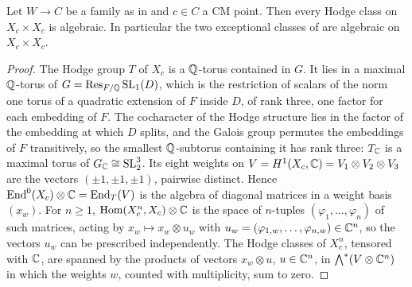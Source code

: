\begin{theorem}\label{thm:mumfordcm}
Let $W\to C$ be a family as in  and $c\in C$ a CM
point. Then every Hodge class on $X_{c}\times X_{c}$ is algebraic. In
particular the two exceptional classes of  are
algebraic on $X_{c}\times X_{c}$.
\end{theorem}

\begin{proof}
The Hodge group $T$ of $X_{c}$ is a $\mathbb{Q}$-torus contained in $G$. It lies in a
maximal $\mathbb{Q}$-torus of $G=\operatorname{Res}_{F/\mathbb{Q}}\operatorname{SL}_{1}(D)$, which is the restriction of
scalars of the norm one torus of a quadratic extension of $F$ inside $D$, of
rank three, one factor for each embedding of $F$. The cocharacter of the Hodge
structure lies in the factor of the embedding at which $D$ splits, and the
Galois group permutes the embeddings of $F$ transitively, so the smallest
$\mathbb{Q}$-subtorus containing it has rank three: $T_{\mathbb{C}}$ is a maximal torus of
$G_{\mathbb{C}}\cong\operatorname{SL}_{2}^{3}$. Its eight weights on
$V=H^{1}(X_{c},\mathbb{C})=V_{1}\otimes V_{2}\otimes V_{3}$ are the vectors
$(\pm1,\pm1,\pm1)$, pairwise distinct. Hence
$\operatorname{End}^{0}(X_{c})\otimes\mathbb{C}=\operatorname{End}_{T}(V)$ is the algebra of diagonal matrices
in a weight basis $(x_{w})$. For $n\ge1$, $\operatorname{Hom}(X_{c}^{n},X_{c})
\otimes\mathbb{C}$ is the space of $n$-tuples $(\varphi_{1},\dots,\varphi_{n})$ of
such matrices, acting by $x_{w}\mapsto x_{w}\otimes u_{w}$ with
$u_{w}=(\varphi_{1,w},\dots,\varphi_{n,w})\in\mathbb{C}^{n}$, so the vectors $u_{w}$
can be prescribed independently. The Hodge classes of $X_{c}^{n}$, tensored
with $\mathbb{C}$, are spanned by the products of vectors $x_{w}\otimes u$,
$u\in\mathbb{C}^{n}$, in $\bigwedge^{*}(V\otimes\mathbb{C}^{n})$ in which the weights $w$,
counted with multiplicity, sum to zero.


\end{proof}
